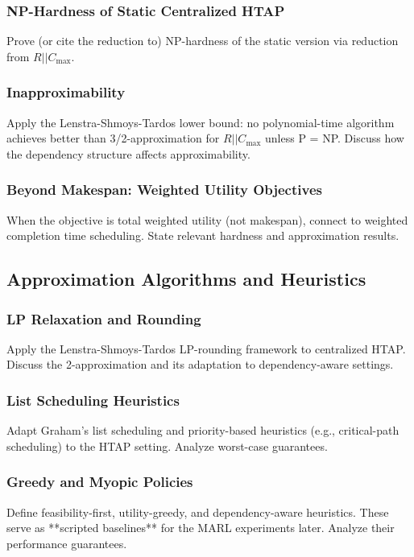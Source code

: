 \subsubsection{NP-Hardness of Static Centralized HTAP}
Prove (or cite the reduction to) NP-hardness of the static version via reduction from $R || C_{\max}$.

\subsubsection{Inapproximability}
Apply the Lenstra-Shmoys-Tardos lower bound: no polynomial-time algorithm achieves better than 3/2-approximation for $R||C_{\max}$ unless P = NP. Discuss how the dependency structure affects approximability.

\subsubsection{Beyond Makespan: Weighted Utility Objectives}
When the objective is total weighted utility (not makespan), connect to weighted completion time scheduling. State relevant hardness and approximation results.

\subsection{Approximation Algorithms and Heuristics}

\subsubsection{LP Relaxation and Rounding}
Apply the Lenstra-Shmoys-Tardos LP-rounding framework to centralized HTAP. Discuss the 2-approximation and its adaptation to dependency-aware settings.

\subsubsection{List Scheduling Heuristics}
Adapt Graham's list scheduling and priority-based heuristics (e.g., critical-path scheduling) to the HTAP setting. Analyze worst-case guarantees.

\subsubsection{Greedy and Myopic Policies}
Define feasibility-first, utility-greedy, and dependency-aware heuristics. These serve as **scripted baselines** for the MARL experiments later. Analyze their performance guarantees.

